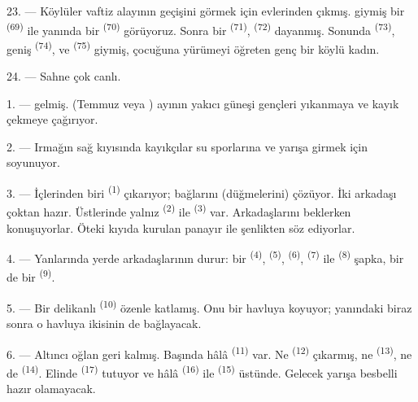 23. --- Köylüler vaftiz alayının geçişini görmek için evlerinden çıkmış.
 giymiş bir  \textsuperscript{(69)} ile
yanında bir  \textsuperscript{(70)} görüyoruz. Sonra bir
 \textsuperscript{(71)}, 
\textsuperscript{(72)} dayanmış. Sonunda 
\textsuperscript{(73)}, geniş 
\textsuperscript{(74)}, ve  \textsuperscript{(75)} giymiş,
çocuğuna yürümeyi öğreten genç bir köylü kadın.

24. --- Sahne çok canlı.
\VUsaut{4.0mm}

\VUsaut{3.0mm}

\VUsaut{2.4mm}

\VUsaut{3.0mm}

1. ---  gelmiş.  (Temmuz veya )
ayının yakıcı güneşi gençleri yıkanmaya ve kayık çekmeye çağırıyor.

2. --- Irmağın sağ kıyısında kayıkçılar su sporlarına ve yarışa girmek için
soyunuyor.

3. --- İçlerinden biri  \textsuperscript{(1)} çıkarıyor;
bağlarını (düğmelerini) çözüyor. İki arkadaşı çoktan hazır. Üstlerinde
yalnız  \textsuperscript{(2)} ile 
\textsuperscript{(3)} var. Arkadaşlarını beklerken konuşuyorlar. Öteki
kıyıda kurulan panayır ile şenlikten söz ediyorlar.

4. --- Yanlarında yerde arkadaşlarının  durur: bir
  \textsuperscript{(4)}, 
\textsuperscript{(5)},  \textsuperscript{(6)}, 
\textsuperscript{(7)} ile  \textsuperscript{(8)} şapka, bir de bir
 \textsuperscript{(9)}.

5. --- Bir delikanlı  \textsuperscript{(10)} özenle katlamış.
Onu bir havluya koyuyor; yanındaki biraz sonra o havluya ikisinin de
 bağlayacak.

6. --- Altıncı oğlan geri kalmış. Başında hâlâ 
\textsuperscript{(11)} var. Ne  \textsuperscript{(12)}
çıkarmış, ne  \textsuperscript{(13)}, ne de
 \textsuperscript{(14)}. Elinde 
\textsuperscript{(17)} tutuyor ve hâlâ 
\textsuperscript{(16)} ile  \textsuperscript{(15)}
üstünde. Gelecek yarışa besbelli hazır olamayacak.


